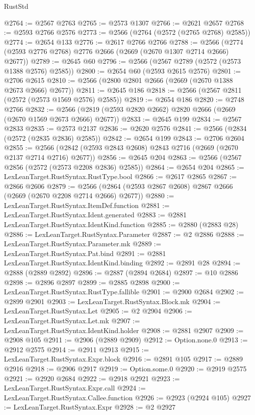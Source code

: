 \begin{lexlean}{RustStd}
\begin{coremodule}
@2764 := @2567 @2763
@2765 := @2573 @1307
@2766 := @2621 @2657
@2768 := @2593 @2766 @2576
@2773 := @2566 (@2764 (@2572 (@2765 @2768) @2585))
@2774 := @2654 @133
@2776 := @2617 @2766 @2766
@2788 := @2566 (@2774 (@2593 @2776 @2768) @2776 @2666 (@2669 (@2670 @1307 @2714 @2666) @2677))
@2789 := @2645 @60
@2796 := @2566 (@2567 @2789 (@2572 (@2573 @1388 @2576) @2585))
@2800 := @2654 @60 (@2593 @2615 @2576)
@2801 := @2706 @2615
@2810 := @2566 (@2800 @2801 @2666 (@2669 (@2670 @1388 @2673 @2666) @2677))
@2811 := @2645 @186
@2818 := @2566 (@2567 @2811 (@2572 (@2573 @1569 @2576) @2585))
@2819 := @2654 @186
@2820 := @2748 @2766
@2832 := @2566 (@2819 (@2593 @2820 @2662) @2820 @2666 (@2669 (@2670 @1569 @2673 @2666) @2677))
@2833 := @2645 @199
@2834 := @2567 @2833
@2835 := @2573 @2137
@2836 := @2620 @2576
@2841 := @2566 (@2834 (@2572 (@2835 @2836) @2585))
@2842 := @2654 @199
@2843 := @2706 @2604
@2855 := @2566 (@2842 (@2593 @2843 @2608) @2843 @2716 (@2669 (@2670 @2137 @2714 @2716) @2677))
@2856 := @2645 @204
@2863 := @2566 (@2567 @2856 (@2572 (@2573 @2208 @2836) @2585))
@2864 := @2654 @204
@2865 := LexLeanTarget.RustSyntax.RustType.bool
@2866 := @2617 @2865
@2867 := @2866 @2606
@2879 := @2566 (@2864 (@2593 @2867 @2608) @2867 @2666 (@2669 (@2670 @2208 @2714 @2666) @2677))
@2880 := LexLeanTarget.RustSyntax.ItemDef.function
@2881 := LexLeanTarget.RustSyntax.Ident.generated
@2883 := @2881 LexLeanTarget.RustSyntax.IdentKind.function
@2885 := @2880 (@2883 @28)
@2886 := LexLeanTarget.RustSyntax.Parameter
@2887 := @2 @2886
@2888 := LexLeanTarget.RustSyntax.Parameter.mk
@2889 := LexLeanTarget.RustSyntax.Pat.bind
@2891 := @2881 LexLeanTarget.RustSyntax.IdentKind.binding
@2892 := @2891 @28
@2894 := @2888 (@2889 @2892)
@2896 := @2887 (@2894 @2684)
@2897 := @10 @2886
@2898 := @2896 @2897
@2899 := @2885 @2898
@2900 := LexLeanTarget.RustSyntax.RustType.fallible
@2901 := @2900 @2684
@2902 := @2899 @2901
@2903 := LexLeanTarget.RustSyntax.Block.mk
@2904 := LexLeanTarget.RustSyntax.Let
@2905 := @2 @2904
@2906 := LexLeanTarget.RustSyntax.Let.mk
@2907 := LexLeanTarget.RustSyntax.IdentKind.holder
@2908 := @2881 @2907
@2909 := @2908 @105
@2911 := @2906 (@2889 @2909)
@2912 := Option.none.{0}
@2913 := @2912 @2575
@2914 := @2911 @2913
@2915 := LexLeanTarget.RustSyntax.Expr.block
@2916 := @2891 @105
@2917 := @2889 @2916
@2918 := @2906 @2917
@2919 := Option.some.{0}
@2920 := @2919 @2575
@2921 := @2920 @2684
@2922 := @2918 @2921
@2923 := LexLeanTarget.RustSyntax.Expr.call
@2924 := LexLeanTarget.RustSyntax.Callee.function
@2926 := @2923 (@2924 @105)
@2927 := LexLeanTarget.RustSyntax.Expr
@2928 := @2 @2927

\end{coremodule}
\end{lexlean}
